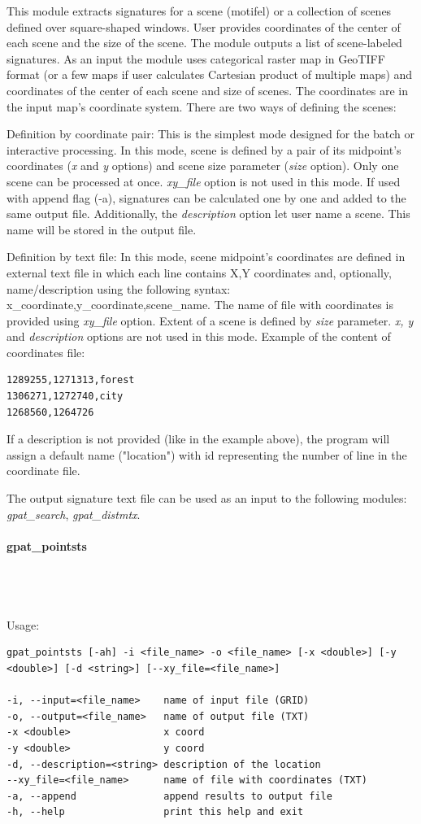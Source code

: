 \documentclass[12pt,margin=0.5in]{article}
\newcommand{\newparagraph}[1]{\paragraph{#1}\mbox{}\\}
\begin{document}
This module extracts signatures for a scene (motifel) or a collection of scenes defined over square-shaped windows. User provides coordinates of the center of each scene and the size of the scene. The module outputs a list of scene-labeled signatures.
As an input the module uses categorical raster map in GeoTIFF format (or a few maps if user calculates Cartesian product of multiple maps) and coordinates of the center of each scene and size of scenes. The coordinates are in the input map's coordinate system. There are two ways of defining the scenes:

Definition by coordinate pair: 
This is the simplest mode designed for the batch or interactive processing. In this mode, scene is defined by a pair of its midpoint's coordinates ({\it x} and {\it y} options) and scene size parameter ({\it size} option). Only one scene can be processed at once. {\it xy\_file} option is not used in this mode.
If used with append flag (-a), signatures can be calculated one by one and added to the same output file. Additionally, the {\it description} option let user name a scene. This name will be stored in the output file.

Definition by text file:
In this mode, scene midpoint's coordinates are defined in external text file in which each line contains X,Y coordinates and, optionally, name/description using the following syntax: x\_coordinate,y\_coordinate,scene\_name. The name of file with coordinates is provided using {\it xy\_file} option. Extent of a scene is defined by {\it size} parameter. {\it x, y} and {\it description} options are not used in this mode. Example of the content of coordinates file: 
\begin{lstlisting}[frame=single]
1289255,1271313,forest
1306271,1272740,city
1268560,1264726
\end{lstlisting}
If a description is not provided (like in the example above), the program will assign a default name ("location") with id representing the number of line in the coordinate file.

The output signature text file can be used as an input to the following modules: {\it gpat\_search}, {\it gpat\_distmtx}.

\newparagraph{gpat\_pointsts}
{}
\\\\
Usage:
\begin{lstlisting}[frame=single]
gpat_pointsts [-ah] -i <file_name> -o <file_name> [-x <double>] [-y <double>] [-d <string>] [--xy_file=<file_name>]

-i, --input=<file_name>    name of input file (GRID)
-o, --output=<file_name>   name of output file (TXT)
-x <double>                x coord
-y <double>                y coord
-d, --description=<string> description of the location
--xy_file=<file_name>      name of file with coordinates (TXT)
-a, --append               append results to output file
-h, --help                 print this help and exit
\end{lstlisting}
\end{document}

